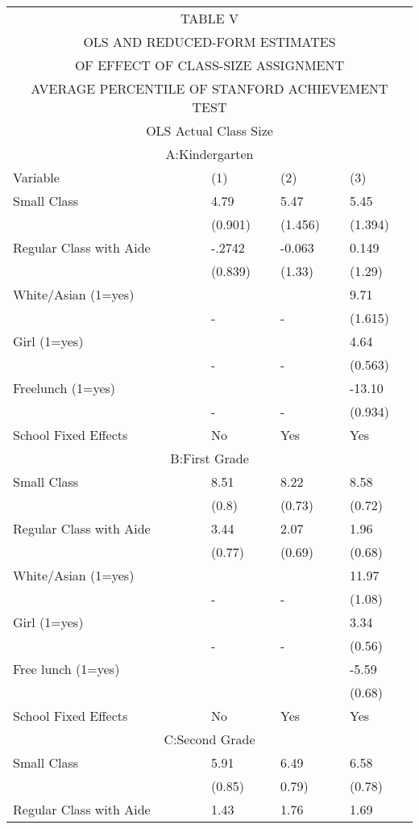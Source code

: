 \begin{tabular}[H]{ |p{4cm}p{2cm}p{2cm}p{2cm}|}
 \hline
 \multicolumn{4}{|c|}{TABLE V} \\
 \multicolumn{4}{|c|}{OLS AND REDUCED-FORM ESTIMATES}\\
 \multicolumn{4}{|c|}{ OF EFFECT OF CLASS-SIZE ASSIGNMENT}\\
 \multicolumn{4}{|c|}{ AVERAGE PERCENTILE OF STANFORD ACHIEVEMENT TEST} \\
 \hline
 \hline
 \multicolumn{4}{|c|}{OLS Actual Class Size} \\
 \hline
 \multicolumn{4}{|c|}{A:Kindergarten} \\
 \hline
   Variable &(1) & (2) & (3) \\
 \hline

Small Class & 4.79&5.47&5.45 \\
&(0.901)&(1.456)&(1.394)\\
Regular Class with Aide&-.2742&-0.063&0.149 \\
&(0.839)&(1.33)&(1.29)\\
White/Asian (1=yes) &&&9.71\\
&-&-&(1.615)\\
Girl (1=yes)&&&4.64 \\
&-&-&(0.563)\\
Freelunch (1=yes)&&&-13.10 \\
&-&-&(0.934)\\
School Fixed Effects & No&Yes&Yes\\
\multicolumn{4}{|c|}{B:First Grade} \\
Small Class& 8.51&8.22&8.58\\
&(0.8)&(0.73)&(0.72)\\
Regular Class with Aide&3.44&2.07&1.96\\
&(0.77)&(0.69)&(0.68)\\
White/Asian (1=yes)&&&11.97\\
&-&-&(1.08)\\
Girl (1=yes)&&&3.34\\
&-&-&(0.56)\\
Free lunch (1=yes)&&&-5.59\\
&&&(0.68)\\
School Fixed Effects & No&Yes&Yes\\
\multicolumn{4}{|c|}{C:Second Grade} \\
Small Class& 5.91&6.49&6.58\\
&(0.85)&0.79)&(0.78)\\
Regular Class with Aide&1.43&1.76&1.69\\

\end{tabular}
